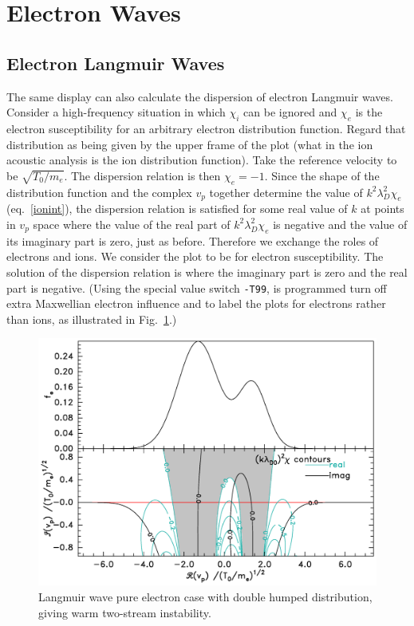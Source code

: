 \documentclass[12pt]{article}
\begin{document}
\section{Electron Waves}

\subsection{Electron Langmuir Waves}
\label{elecLang}

The same display can also calculate the dispersion of electron
Langmuir waves. Consider a high-frequency situation in which $\chi_i$
can be ignored and $\chi_e$ is the electron susceptibility for an
arbitrary electron distribution function. Regard that distribution as
being given by the upper frame of the plot (what in the ion acoustic
analysis is the ion distribution function). Take the reference
velocity to be $\sqrt{T_0/m_e}$. The dispersion relation is then
$\chi_e=-1$. Since the shape of the distribution function and the complex
$v_p$ together determine the value of $k^2\lambda_D^2 \chi_e$ (eq.\
\ref{ionint}), the dispersion relation is satisfied for some real
value of $k$ at points in $v_p$ space where the value of the real part
of $k^2\lambda_D^2 \chi_e$ is negative and the value of its imaginary
part is zero, just as before.  Therefore we exchange the roles of
electrons and ions. We consider the plot to be for electron
susceptibility. The solution of the dispersion relation is where the
imaginary part is zero and the real part is negative. (Using the
special value switch \verb!-T99!, is programmed turn off extra Maxwellian
electron influence and to label the plots for electrons
rather than ions, as illustrated in Fig.\ \ref{langmuir}.)
\begin{figure}[ht]
\center
\includegraphics[width=0.7\hsize]{langmuir}
\caption{Langmuir wave pure electron case with double humped
  distribution, giving warm two-stream instability.\label{langmuir}}  
\end{figure}
\end{document}
